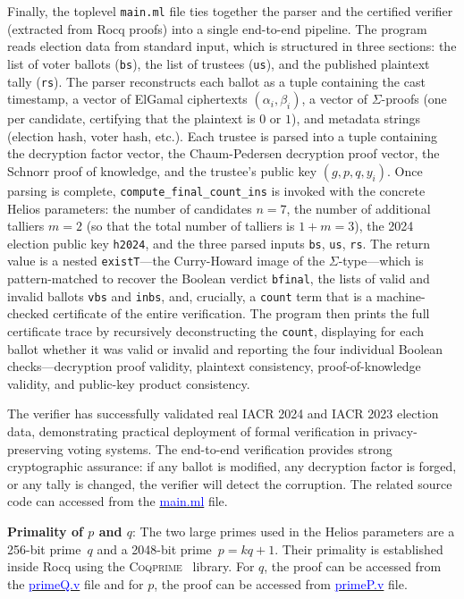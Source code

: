 \documentclass[sigconf,anonymous,review]{acmart}
\begin{document}
Finally, the toplevel \texttt{main.ml} file ties together the parser
and the certified verifier (extracted from Rocq proofs) into a single end-to-end pipeline.
The program reads election data from standard input, which is structured
in three sections: the list of voter ballots
(\texttt{bs}), the list of trustees (\texttt{us}), and the published
plaintext tally (\texttt{rs}).
The parser reconstructs each ballot as a tuple containing the cast timestamp,
a vector of ElGamal ciphertexts $(\alpha_i, \beta_i)$, a vector of $\Sigma$-proofs (one per candidate, certifying that the plaintext is $0$ or $1$),
and metadata strings (election hash, voter hash, etc.).
Each trustee is parsed into a tuple containing the decryption factor vector,
the Chaum-Pedersen decryption proof vector, the Schnorr proof of knowledge,
and the trustee's public key $(g, p, q, y_i)$. Once parsing is complete, \texttt{compute\_final\_count\_ins} is invoked
with the concrete Helios parameters:
the number of candidates $n = 7$, the number of additional talliers
$m = 2$ (so that the total number of talliers is $1 + m = 3$), the
2024 election public key \texttt{h2024}, and the three parsed inputs
\texttt{bs}, \texttt{us}, \texttt{rs}.
The return value is a nested \texttt{existT}---the Curry-Howard
image of the $\Sigma$-type---which is pattern-matched to recover the
Boolean verdict \texttt{bfinal}, the lists of valid and invalid ballots
\texttt{vbs} and \texttt{inbs}, and, crucially, a \texttt{count} term
that is a machine-checked certificate of the entire verification.
The program then prints the full certificate trace by
recursively deconstructing the \texttt{count}, displaying for
each ballot whether it was valid or invalid and reporting the four individual Boolean checks---decryption proof
validity, plaintext consistency, proof-of-knowledge validity, and public-key product consistency.

The verifier has successfully validated real IACR 2024 and IACR 2023 election data, demonstrating practical deployment 
of formal verification in privacy-preserving voting systems. The end-to-end verification provides strong 
cryptographic assurance: if any ballot is modified, any decryption factor is forged, or any tally is 
changed, the verifier will detect the corruption. The related source code can accessed 
from the \href{https://anonymous.4open.science/r/SigmaProtocol-EBA5/src/Executable/HeliosVerifiercode/main.ml}{\textcolor{blue}{main.ml}} file.


\textbf{Primality of $p$ and $q$}:
The two large primes used in the Helios parameters are a 256-bit prime~$q$
and a 2048-bit prime~$p = kq + 1$.
Their primality is established inside Rocq using the
\textsc{Coqprime}~\cite{thery2007primality} library.  For $q$, the proof can be accessed from the \href{https://anonymous.4open.science/r/SigmaProtocol-EBA5/src/Examples/primeQ.v}{\textcolor{blue}{primeQ.v}} file and 
for $p$, the proof can be accessed from \href{https://anonymous.4open.science/r/SigmaProtocol-EBA5/src/Examples/primeP.v}{\textcolor{blue}{primeP.v}} file.  
\end{document}
